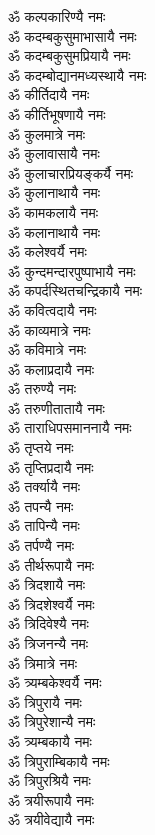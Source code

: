 \begin{flushleft}
\begin{multicols}{2}
ॐ कल्पकारिण्यै नमः\\
ॐ कदम्बकुसुमाभासायै नमः\\
ॐ कदम्बकुसुमप्रियायै नमः\\
ॐ कदम्बोद्यानमध्यस्थायै नमः\\
ॐ कीर्तिदायै नमः\\
ॐ कीर्तिभूषणायै नमः\\
ॐ कुलमात्रे नमः\\
ॐ कुलावासायै नमः\\
ॐ कुलाचारप्रियङ्कर्यै नमः\hfill{}\\
ॐ कुलानाथायै नमः\\
ॐ कामकलायै नमः\\
ॐ कलानाथायै नमः\\
ॐ कलेश्वर्यै नमः\\
ॐ कुन्दमन्दारपुष्पाभायै नमः\\
ॐ कपर्दस्थितचन्द्रिकायै नमः\\
ॐ कवित्वदायै नमः\\
ॐ काव्यमात्रे नमः\\
ॐ कविमात्रे नमः\\
ॐ कलाप्रदायै नमः\hfill{}\\
ॐ तरुण्यै नमः\\
ॐ तरुणीतातायै नमः\\
ॐ ताराधिपसमाननायै नमः\\
ॐ तृप्तये नमः\\
ॐ तृप्तिप्रदायै नमः\\
ॐ तर्क्यायै नमः\\
ॐ तपन्यै नमः\\
ॐ तापिन्यै नमः\\
ॐ तर्पण्यै नमः\\
ॐ तीर्थरूपायै नमः\hfill{}\\
ॐ त्रिदशायै नमः\\
ॐ त्रिदशेश्वर्यै नमः\\
ॐ त्रिदिवेश्यै नमः\\
ॐ त्रिजनन्यै नमः\\
ॐ त्रिमात्रे नमः\\
ॐ त्र्यम्बकेश्वर्यै नमः\\
ॐ त्रिपुरायै नमः\\
ॐ त्रिपुरेशान्यै नमः\\
ॐ त्र्यम्बकायै नमः\\
ॐ त्रिपुराम्बिकायै नमः\hfill{}\\
ॐ त्रिपुरश्रियै नमः\\
ॐ त्रयीरूपायै नमः\\
ॐ त्रयीवेद्यायै नमः\\

\end{multicols}
\end{flushleft}
